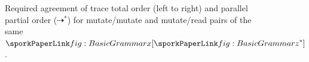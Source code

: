 \begin{figure}[h]
\sporkForceStacktrue
\sporkCodeRule
\centering
\begin{sporkfigure}
  
\end{sporkfigure}
\caption{Required agreement of trace total order (left to right) and parallel partial order ($\dashrightarrow^*$) for mutate/mutate and mutate/read pairs of the same $\sporkx[\sporkz^*]$.}
\label{fig:RequiredOrderings}
\sporkCodeRule
\end{figure}
